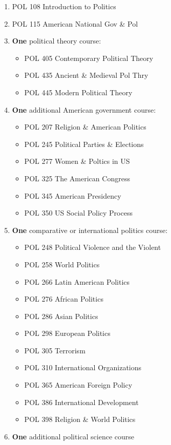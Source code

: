\documentclass[
  letterpaper,
]{scrbook}
\providecommand{\tightlist}{%
  \setlength{\itemsep}{0pt}\setlength{\parskip}{0pt}}
\begin{document}
\begin{enumerate}
\def\labelenumi{\arabic{enumi}.}
\item
  POL 108 Introduction to Politics
\item
  POL 115 American National Gov \& Pol
\item
  \textbf{One} political theory course:

  \begin{itemize}
  \tightlist
  \item
    POL 405 Contemporary Political Theory
  \item
    POL 435 Ancient \& Medieval Pol Thry
  \item
    POL 445 Modern Political Theory
  \end{itemize}
\item
  \textbf{One} additional American government course:

  \begin{itemize}
  \tightlist
  \item
    POL 207 Religion \& American Politics
  \item
    POL 245 Political Parties \& Elections
  \item
    POL 277 Women \& Poltics in US
  \item
    POL 325 The American Congress
  \item
    POL 345 American Presidency
  \item
    POL 350 US Social Policy Process
  \end{itemize}
\item
  \textbf{One} comparative or international politics course:

  \begin{itemize}
  \tightlist
  \item
    POL 248 Political Violence and the Violent
  \item
    POL 258 World Politics
  \item
    POL 266 Latin American Politics
  \item
    POL 276 African Politics
  \item
    POL 286 Asian Politics
  \item
    POL 298 European Politics
  \item
    POL 305 Terrorism
  \item
    POL 310 International Organizations
  \item
    POL 365 American Foreign Policy
  \item
    POL 386 International Development
  \item
    POL 398 Religion \& World Politics
  \end{itemize}
\item
  \textbf{One} additional political science course
\end{enumerate}
\end{document}
